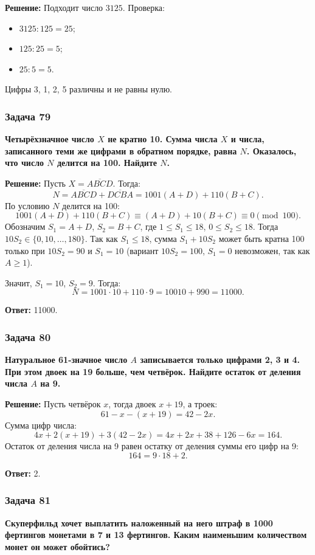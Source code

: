 \documentclass[12pt, a4paper]{article}
\begin{document}
\textbf{Решение:}
Подходит число $3125$. Проверка:
\begin{itemize}
    \item $3125 : 125 = 25$;
    \item $125 : 25 = 5$;
    \item $25 : 5 = 5$.
\end{itemize}
Цифры 3, 1, 2, 5 различны и не равны нулю.

\subsubsection*{Задача 79}
\textbf{Четырёхзначное число $X$ не кратно 10. Сумма числа $X$ и числа, записанного теми же цифрами в обратном порядке, равна $N$. Оказалось, что число $N$ делится на 100. Найдите $N$.}

\textbf{Решение:}
Пусть $X = \overline{ABCD}$. Тогда:
\[
N = \overline{ABCD} + \overline{DCBA} = 1001(A+D) + 110(B+C).
\]
По условию $N$ делится на 100:
\[
1001(A+D) + 110(B+C) \equiv (A+D) + 10(B+C) \equiv 0 \pmod{100}.
\]
Обозначим $S_1 = A+D$, $S_2 = B+C$, где $1 \le S_1 \le 18$, $0 \le S_2 \le 18$. Тогда $10S_2 \in \{0, 10, \ldots, 180\}$. Так как $S_1 \le 18$, сумма $S_1 + 10S_2$ может быть кратна 100 только при $10S_2 = 90$ и $S_1 = 10$ (вариант $10S_2 = 100$, $S_1 = 0$ невозможен, так как $A \ge 1$).

Значит, $S_1 = 10$, $S_2 = 9$. Тогда:
\[
N = 1001 \cdot 10 + 110 \cdot 9 = 10010 + 990 = 11000.
\]

\textbf{Ответ:} 11000.

\subsubsection*{Задача 80}
\textbf{Натуральное 61-значное число $A$ записывается только цифрами 2, 3 и 4. При этом двоек на 19 больше, чем четвёрок. Найдите остаток от деления числа $A$ на 9.}

\textbf{Решение:}
Пусть четвёрок $x$, тогда двоек $x+19$, а троек:
\[
61 - x - (x+19) = 42 - 2x.
\]
Сумма цифр числа:
\[
4x + 2(x+19) + 3(42 - 2x) = 4x + 2x + 38 + 126 - 6x = 164.
\]
Остаток от деления числа на 9 равен остатку от деления суммы его цифр на 9:
\[
164 = 9 \cdot 18 + 2.
\]

\textbf{Ответ:} 2.

\subsubsection*{Задача 81}
\textbf{Скуперфильд хочет выплатить наложенный на него штраф в 1000 фертингов монетами в 7 и 13 фертингов. Каким наименьшим количеством монет он может обойтись?}
\end{document}
